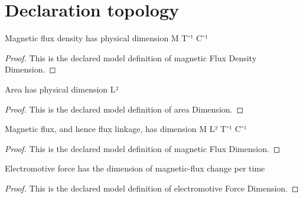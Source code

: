 \section{Declaration topology}
\begin{definition}
  \label{def:physics:phyx-mini-0933:phyxminiproblems-problemphyxmini0933-magneticfluxdensitydimension}
  Magnetic flux density has physical dimension M T⁻¹ C⁻¹
\end{definition}
\begin{proof}
  This is the declared model definition of magnetic Flux Density Dimension.
\end{proof}
\begin{definition}
  \label{def:physics:phyx-mini-0933:phyxminiproblems-problemphyxmini0933-areadimension}
  Area has physical dimension L²
\end{definition}
\begin{proof}
  This is the declared model definition of area Dimension.
\end{proof}
\begin{definition}
  \label{def:physics:phyx-mini-0933:phyxminiproblems-problemphyxmini0933-magneticfluxdimension}
  Magnetic flux, and hence flux linkage, has dimension M L² T⁻¹ C⁻¹
\end{definition}
\begin{proof}
  This is the declared model definition of magnetic Flux Dimension.
\end{proof}
\begin{definition}
  \label{def:physics:phyx-mini-0933:phyxminiproblems-problemphyxmini0933-electromotiveforcedimension}
  Electromotive force has the dimension of magnetic-flux change per time
\end{definition}
\begin{proof}
  This is the declared model definition of electromotive Force Dimension.
\end{proof}
